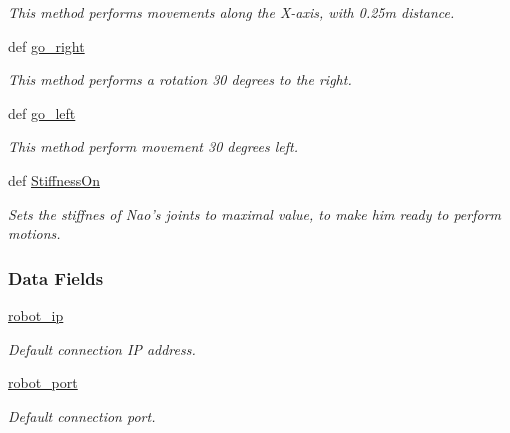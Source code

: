 \begin{DoxyCompactItemize}
\begin{DoxyCompactList}\small\item\em This method performs movements along the X-\/axis, with 0.\+25m distance. \end{DoxyCompactList}\item 
\hypertarget{class_nao_agent_1_1_nao_agent_a1825cf4236b693f347db9c793206049c}{def \hyperlink{class_nao_agent_1_1_nao_agent_a1825cf4236b693f347db9c793206049c}{go\+\_\+right}}\label{class_nao_agent_1_1_nao_agent_a1825cf4236b693f347db9c793206049c}

\begin{DoxyCompactList}\small\item\em This method performs a rotation 30 degrees to the right. \end{DoxyCompactList}\item 
\hypertarget{class_nao_agent_1_1_nao_agent_a3661eec663302a3b67351833c2c9b8de}{def \hyperlink{class_nao_agent_1_1_nao_agent_a3661eec663302a3b67351833c2c9b8de}{go\+\_\+left}}\label{class_nao_agent_1_1_nao_agent_a3661eec663302a3b67351833c2c9b8de}

\begin{DoxyCompactList}\small\item\em This method perform movement 30 degrees left. \end{DoxyCompactList}\item 
def \hyperlink{class_nao_agent_1_1_nao_agent_add7585e99624d7863d2e1291b1af2669}{Stiffness\+On}
\begin{DoxyCompactList}\small\item\em Sets the stiffnes of Nao's joints to maximal value, to make him ready to perform motions. \end{DoxyCompactList}\end{DoxyCompactItemize}
\subsubsection*{Data Fields}
\begin{DoxyCompactItemize}
\item 
\hypertarget{class_nao_agent_1_1_nao_agent_a70221305bf8db6392330ef28121efd25}{\hyperlink{class_nao_agent_1_1_nao_agent_a70221305bf8db6392330ef28121efd25}{robot\+\_\+ip}}\label{class_nao_agent_1_1_nao_agent_a70221305bf8db6392330ef28121efd25}

\begin{DoxyCompactList}\small\item\em Default connection I\+P address. \end{DoxyCompactList}\item 
\hypertarget{class_nao_agent_1_1_nao_agent_a9282cdfa59976fe1cfc1a539df185c27}{\hyperlink{class_nao_agent_1_1_nao_agent_a9282cdfa59976fe1cfc1a539df185c27}{robot\+\_\+port}}\label{class_nao_agent_1_1_nao_agent_a9282cdfa59976fe1cfc1a539df185c27}

\begin{DoxyCompactList}\small\item\em Default connection port. \end{DoxyCompactList}\end{DoxyCompactItemize}


